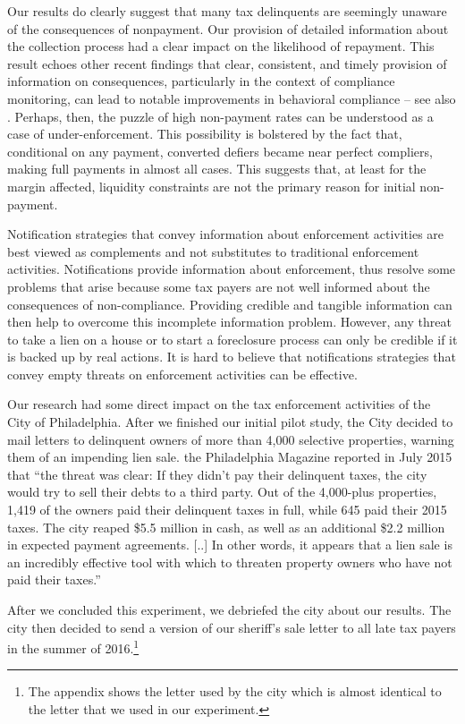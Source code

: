 \documentclass[12pt]{article}
\begin{document}
Our results do clearly suggest that many tax delinquents are seemingly
unaware of the consequences of nonpayment. Our provision of detailed
information about the collection process had a clear impact on the
likelihood of repayment. This result echoes other recent findings that
clear, consistent, and timely provision of information on
consequences, particularly in the context of compliance monitoring,
can lead to notable improvements in behavioral compliance -- see also
. Perhaps, then, the puzzle of high non-payment rates
can be understood as a case of under-enforcement. This possibility is
bolstered by the fact that, conditional on any payment, converted
defiers became near perfect compliers, making full payments in almost
all cases. This suggests that, at least for the margin affected,
liquidity constraints are not the primary reason for initial
non-payment.

Notification strategies that convey information about enforcement
activities are best viewed as complements and not substitutes to
traditional enforcement activities.  Notifications provide information
about enforcement, thus resolve some problems that arise because some
tax payers are not well informed about the consequences of
non-compliance.  Providing credible and tangible information can then
help to overcome this incomplete information problem.  However, any
threat to take a lien on a house or to start a foreclosure process can
only be credible if it is backed up by real actions. It is hard to
believe that notifications strategies that convey empty threats on
enforcement activities can be effective.

Our research had some direct impact on the tax enforcement activities
of the City of Philadelphia. After we finished our initial pilot
study, the City decided to mail letters to delinquent owners of more
than 4,000 selective properties, warning them of an impending lien
sale. the Philadelphia Magazine reported in July 2015 that ``the
threat was clear: If they didn't pay their delinquent taxes, the city
would try to sell their debts to a third party. Out of the 4,000-plus
properties, 1,419 of the owners paid their delinquent taxes in full,
while 645 paid their 2015 taxes. The city reaped \$5.5 million in
cash, as well as an additional \$2.2 million in expected payment
agreements. [..] In other words, it appears that a lien sale is an incredibly effective
tool with which to threaten property owners who have not paid their
taxes.'' 

After we concluded this experiment, we debriefed the city
about our results. The city then decided to send a version of our
sheriff's sale letter to all late tax payers in the summer of
2016.\footnote{The appendix shows the letter used by the city which is 
almost identical to the letter that we used in our experiment.}
\end{document}
